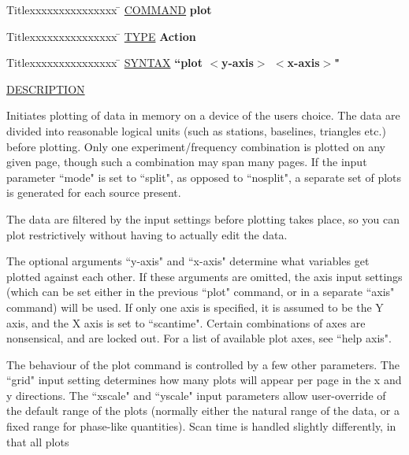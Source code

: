 \begin{tabbing}
Titlexxxxxxxxxxxxxxx \= \kill
\underline{COMMAND} \> {\bf 	plot} \\
\end{tabbing}

\begin{tabbing}
Titlexxxxxxxxxxxxxxx \= \kill
\underline{TYPE} \> {\bf 		Action} \\
\end{tabbing}

\begin{tabbing}
Titlexxxxxxxxxxxxxxx \= \kill
\underline{SYNTAX} \> {\bf 		``plot $<$y-axis$>$ $<$x-axis$>$"} \\
\end{tabbing}

\underline{DESCRIPTION}
\begin{list}{}{\setlength{\leftmargin}{0.5in}
     \setlength{\rightmargin}{0in}}
\item
Initiates plotting of data in memory on a device of the
users choice.  The data are divided into reasonable logical
units (such as stations, baselines, triangles etc.) before
plotting.  Only one experiment/frequency combination is
plotted on any given page, though such a combination may
span many pages.  If the input parameter ``mode" is set to
``split", as opposed to ``nosplit", a separate set of plots 
is generated for each source present.  
\item
The data are filtered by the input settings
before plotting takes place, so you can plot restrictively
without having to actually edit the data.
\item
The optional arguments ``y-axis" and ``x-axis" determine what
variables get plotted against each other.  If these
arguments are omitted, the axis input settings (which
can be set either in the previous ``plot" command, or in
a separate ``axis" command) will be used.  If only one axis
is specified, it is assumed to be the Y axis, and the X axis
is set to ``scantime".  Certain combinations of axes are
nonsensical, and are locked out.  For a list of available
plot axes, see ``help axis".
\item
The behaviour of the plot command is controlled by a few other
parameters.  The ``grid" input setting determines how many
plots will appear per page in the x and y directions.  The
``xscale" and ``yscale" input parameters allow user-override
of the default range of the plots (normally either the natural
range of the data, or a fixed range for phase-like quantities).
Scan time is handled slightly differently, in that all plots

\end{list}
